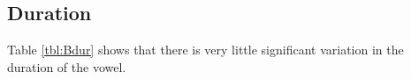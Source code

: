 \documentclass[../../../00.FullDoc/tex/APRReport-year4]{subfiles}
\begin{document}
\begin{figure}[h]
	
	\caption{\bath{}} \label{fig:TBPF2}
\end{figure}


\subsection{Duration}
Table \ref{tbl:Bdur} shows that there is very little significant variation in the duration of the \bath{} vowel.



	
	
	
	
	
	 
	\ifSubfilesClassLoaded{%
		}
	
	
\end{document}
